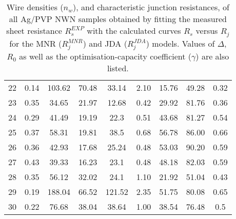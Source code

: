 \begin{table}
\begin{center}
\begin{tabular}{| c | c c c c c c c c |}
22 & 0.14 & 103.62 & 70.48 & 33.14 & 2.10 & 15.76 & 49.28 & 0.32 \\ 
23 & 0.35 & 34.65 & 21.97 & 12.68 & 0.42 & 29.92 & 81.76 & 0.36 \\ 
24 & 0.29 & 41.49 & 19.19 & 22.3 & 0.51 & 43.68 & 81.27 & 0.54 \\ 
25 & 0.37 & 58.31 & 19.81 & 38.5 & 0.68 & 56.78 & 86.00 & 0.66 \\ 
26 & 0.36 & 42.93 & 17.68 & 25.24 & 0.48 & 53.03 & 90.20 & 0.59 \\ 
27 & 0.43 & 39.33 & 16.23 & 23.1 & 0.48 & 48.18 & 82.03 & 0.59 \\ 
28 & 0.35 & 56.12 & 32.02 & 24.1 & 1.10 & 21.92 & 51.04 & 0.43 \\ 
29 & 0.19 & 188.04 & 66.52 & 121.52 & 2.35 & 51.75 & 80.08 & 0.65 \\ 
30 & 0.22 & 76.68 & 38.04 & 38.64 & 1.00 & 38.54 & 76.48 & 0.5 \\ 
\hline
\end{tabular}
\caption{Wire densities ($n_w$), and characteristic junction resistances, of all Ag/PVP NWN samples obtained by fitting the measured sheet resistance $R_s^{EXP}$ with the calculated curves $R_s$ versus $R_j$ for the MNR ($R_j^{MNR}$) and JDA ($R_j^{JDA}$) models. Values of $\Delta$, $R_0$ as well as the optimisation-capacity coefficient ($\gamma$) are also listed\cite{rocha2015}. }
\label{tab: nwn_exp}
\end{center}
\end{table}
